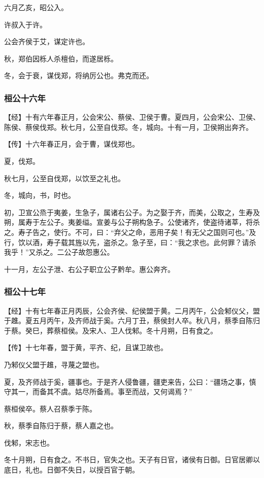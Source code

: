 \documentclass[]{article}
\begin{document}
六月乙亥，昭公入。

许叔入于许。

公会齐侯于艾，谋定许也。

秋，郑伯因栎人杀檀伯，而遂居栎。

冬，会于衰，谋伐郑，将纳厉公也。弗克而还。

\hypertarget{header-n317}{%
\subsubsection{桓公十六年}\label{header-n317}}

【经】十有六年春正月，公会宋公、蔡侯、卫侯于曹。夏四月，公会宋公、卫侯、陈侯、蔡侯伐郑。秋七月，公至自伐郑。冬，城向。十有一月，卫侯朔出奔齐。

【传】十六年春正月，会于曹，谋伐郑也。

夏，伐郑。

秋七月，公至自伐郑，以饮至之礼也。

冬，城向，书，时也。

初，卫宣公烝于夷姜，生急子，属诸右公子。为之娶于齐，而美，公取之，生寿及朔，属寿于左公子。夷姜缢。宣姜与公子朔构急子。公使诸齐，使盗待诸莘，将杀之。寿子告之，使行。不可，曰：``弃父之命，恶用子矣！有无父之国则可也。''及行，饮以酒，寿子载其旌以先，盗杀之。急子至，曰：``我之求也。此何罪？请杀我乎！''又杀之。二公子故怨惠公。

十一月，左公子泄、右公子职立公子黔牟。惠公奔齐。

\hypertarget{header-n327}{%
\subsubsection{桓公十七年}\label{header-n327}}

【经】十有七年春正月丙辰，公会齐侯、纪侯盟于黄。二月丙午，公会邾仪父，盟于趡。夏五月丙午，及齐师战于奚。六月丁丑，蔡侯封人卒。秋八月，蔡季自陈归于蔡。癸巳，葬蔡桓侯。及宋人、卫人伐邾。冬十月朔，日有食之。

【传】十七年春，盟于黄，平齐、纪，且谋卫故也。

乃邾仪父盟于趡，寻蔑之盟也。

夏，及齐师战于奚，疆事也。于是齐人侵鲁疆，疆吏来告，公曰：``疆场之事，慎守其一，而备其不虞。姑尽所备焉。事至而战，又何谒焉？''

蔡桓侯卒。蔡人召蔡季于陈。

秋，蔡季自陈归于蔡，蔡人嘉之也。

伐邾，宋志也。

冬十月朔，日有食之。不书日，官失之也。天子有日官，诸侯有日御。日官居卿以底日，礼也。日御不失日，以授百官于朝。
\end{document}
